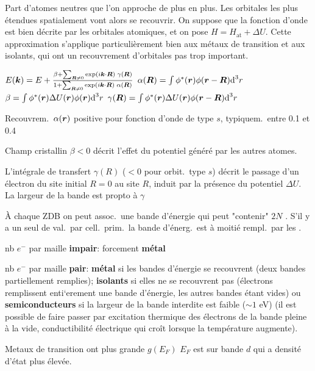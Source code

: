 Part d'atomes neutres que l'on approche de plus en plus.
Les orbitales les plus étendues spatialement vont alors se recouvrir. 
On suppose que la fonction d'onde est bien décrite par les orbitales
atomiques, et on pose $H = H_{\text{at}} + \Delta U$. 
Cette approximation s'applique particulièrement
bien aux métaux de transition et aux isolants, qui ont un recouvrement d'orbitales pas
trop important.
\begin{squishlist}
    \item $E(\bm{k}) = E + \frac{\beta + \sum_{\bm{R} \neq 0}\exp(i\bm{k} \cdot \bm{R}) \; \gamma(\bm{R})}{1 + \sum_{\bm{R} \neq 0}\exp(i\bm{k} \cdot \bm{R})\; \alpha(\bm{R})}$
    \qquad $\alpha(\bm{R}) = \int \phi^*(\bm{r})\phi(\bm{r} - \bm{R}) \textrm{d}^3 r$ \\
    $\beta = \int \phi^*(\bm{r})\Delta U (\bm{r}) \phi(\bm{r}) \textrm{d}^3 r$ \qquad $\gamma(\bm{R}) = \int \phi^*(\bm{r})\Delta U (\bm{r}) \phi(\bm{r} - \bm{R}) \textrm{d}^3 r$
    \item Recouvrem.\ $\alpha(\bm{r})$ positive pour fonction d'onde de type $s$, typiquem.\ entre 0.1 et 0.4
    \item Champ cristallin $\beta < 0$ décrit l'effet du potentiel généré par les autres atomes.
    \item L'intégrale de transfert $\gamma(R)$ ($<0$ pour orbit.\ type $s$) décrit le passage d'un électron du site initial $R = 0$ au site $R$, induit par la présence du potentiel $\Delta U$.
    La largeur de la bande est propto à $\gamma$
\end{squishlist}

À chaque ZDB on peut assoc.\ une bande d'énergie qui peut "contenir" $2N$ \elec.
S’il y a un seul \elec de val.\ par cell.\ prim.\, la bande d’énerg.\
est à moitié rempl.\ par les \elec.
\begin{squishlist}
    \item  nb $e^-$ par maille \textbf{impair}: forcement \textbf{métal}
    \item  nb $e^-$ par maille \textbf{pair}: \textbf{métal} si les bandes d'énergie se recouvrent (deux bandes partiellement remplies); \textbf{isolants} si elles ne se recouvrent pas (électrons remplissent enti`erement une bande d’énergie, les autres bandes étant vides) ou \textbf{semiconducteurs} si la largeur de la bande interdite est faible ($\sim 1 $ eV) (il est possible de faire passer par excitation thermique des électrons de la bande pleine à la vide, conductibilité électrique qui croît lorsque la température augmente).
    \item Metaux de transition ont plus grande $g(E_F)$ $E_F$ est sur bande $d$ qui a densité d'état plus élevée.
\end{squishlist}


